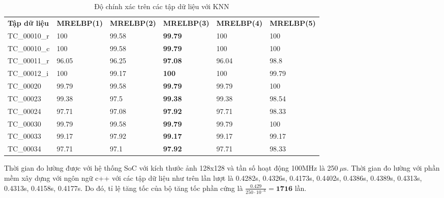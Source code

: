 \begin{table}[!ht]
	\centering
	\renewcommand{\arraystretch}{1.3}
	\caption{Độ chính xác trên các tập dữ liệu với KNN}
	\begin{tabular}{|p{2.5cm} p{2.5cm} p{2.5cm} p{2.5cm} p{2.5cm} p{2.5cm}|}
		\hline
		\rowcolor{gray!30}
		\textbf{Tập dữ liệu} & \textbf{MRELBP(1)}  & \textbf{MRELBP(2)} & \textbf{MRELBP(3) } &  \textbf{MRELBP(4)} & \textbf{MRELBP(5)}  \\
		TC\_00010\_r & 100 & 99.58& \textbf{99.79} & 100 & 100
		\\ \hline
		TC\_00010\_c & 100 & 99.58 & \textbf{99.79} & 100 & 100
		\\ \hline
		TC\_00011\_r & 96.05 &96.25 & \textbf{97.08} & 96.04 & 98.8
		\\ \hline
		TC\_00012\_i & 100 & 99.17 & \textbf{100} & 100 & 99.79
		\\ \hline
		TC\_00020 & 99.79 & 99.58 & \textbf{99.79} & 99.79 & 100
		\\ \hline
		TC\_00023 & 99.38 & 97.5 & \textbf{99.38} & 99.38 & 98.54
		\\ \hline
		TC\_00024 & 97.71 & 97.08 & \textbf{97.92} & 97.71 & 98.33
		\\ \hline                   
		TC\_00030 & 99.79 & 99.58 & \textbf{99.79} & 99.79 & 100
		\\ \hline
		TC\_00033 & 99.17 & 97.92 & \textbf{99.17} & 99.17 & 99.17
		\\ \hline
		TC\_00034 & 97.71 & 97.1 & \textbf{97.92} & 97.71 & 98.33
		\\ \hline
	\end{tabular}
	
	\label{tab:knn}
\end{table}


Thời gian đo lường được với hệ thống SoC với kích thước ảnh 128x128 và tần số hoạt động 100MHz là 250$~\mu\text{s}$. Thời gian đo lường với phần mềm xây dựng với ngôn ngữ c++ với các tập dữ liệu như trên lần lượt là 0.4282s, 0.4326s, 0.4173s, 0.4402s, 0.4386s, 0.4389s, 0.4313s, 0.4313s, 0.4158s, 0.4177s. Do đó, tỉ lệ tăng tốc của bộ tăng tốc phần cứng là $\frac{0.429}{250\cdot10^{-6}}=\textbf{1716}$ lần.

